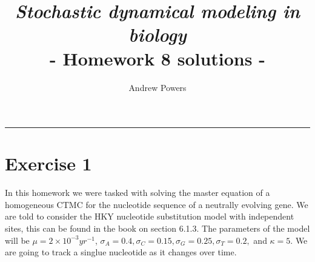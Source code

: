 \documentclass[letter,12pt]{article}
\title{\emph{Stochastic dynamical modeling in biology}\\\vspace{1em}- Homework 8 solutions -}
\author{Andrew Powers}
\date{}
\begin{document}
\maketitle %
\hrule %



\section{Exercise 1}

In this homework we were tasked with solving the master equation of a homogeneous CTMC for the nucleotide sequence of a neutrally evolving gene.
We are told to consider the HKY nucleotide substitution model with independent sites, this can be found in the book on section 6.1.3.
The parameters of the model will be $\mu = 2 \times 10^{-3} yr^{-1}$, $\sigma_A = 0.4, \sigma_C = 0.15, \sigma_G = 0.25, \sigma_T = 0.2,$ and $\kappa = 5$.
We are going to track a singlue nucleotide as it changes over time. 
\end{document}
